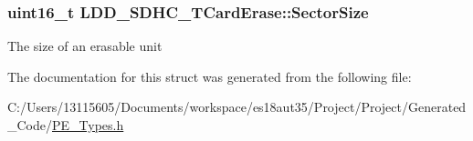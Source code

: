 \subsubsection[{Sector\+Size}]{\setlength{\rightskip}{0pt plus 5cm}uint16\+\_\+t L\+D\+D\+\_\+\+S\+D\+H\+C\+\_\+\+T\+Card\+Erase\+::\+Sector\+Size}\label{struct_l_d_d___s_d_h_c___t_card_erase_a3c0c33e89b65f4f6bfd6043585df5486}
The size of an erasable unit 

The documentation for this struct was generated from the following file\+:\begin{DoxyCompactItemize}
\item 
C\+:/\+Users/13115605/\+Documents/workspace/es18aut35/\+Project/\+Project/\+Generated\+\_\+\+Code/\hyperlink{_p_e___types_8h}{P\+E\+\_\+\+Types.\+h}\end{DoxyCompactItemize}
